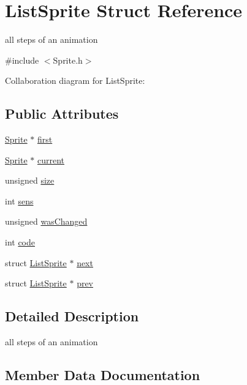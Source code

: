 \hypertarget{structListSprite}{}\section{List\+Sprite Struct Reference}
\label{structListSprite}


all steps of an animation  




{\ttfamily \#include $<$Sprite.\+h$>$}



Collaboration diagram for List\+Sprite\+:
\subsection*{Public Attributes}
\begin{DoxyCompactItemize}
\item 
\hyperlink{structSprite}{Sprite} $\ast$ \hyperlink{structListSprite_ad9a0c4aba9987a7a50986cfe6713dd1e}{first}
\item 
\hyperlink{structSprite}{Sprite} $\ast$ \hyperlink{structListSprite_a3b1ab9fe7a6593fbe2767e7b2a7f6676}{current}
\item 
unsigned \hyperlink{structListSprite_a6dd83abf2a154c0a4cc8887d7ffc20e3}{size}
\item 
int \hyperlink{structListSprite_a2f28d2c699f6cf22ff8ebfed1d71fc75}{sens}
\item 
unsigned \hyperlink{structListSprite_acb741e12837c8bf6499506f30ca46477}{was\+Changed}
\item 
int \hyperlink{structListSprite_acf824bc4a786357423b4e697ab7e3c91}{code}
\item 
struct \hyperlink{structListSprite}{List\+Sprite} $\ast$ \hyperlink{structListSprite_a9a866f0341b7fad117cbf1d19e1cba9c}{next}
\item 
struct \hyperlink{structListSprite}{List\+Sprite} $\ast$ \hyperlink{structListSprite_a9ea0649f66bf1b779298adc3281ce8b8}{prev}
\end{DoxyCompactItemize}


\subsection{Detailed Description}
all steps of an animation 

\subsection{Member Data Documentation}
